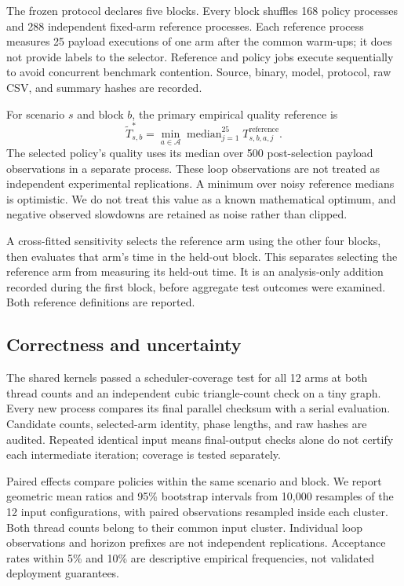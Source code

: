 \documentclass[conference]{IEEEtran}
\begin{document}
The frozen protocol declares five blocks. Every block shuffles 168 policy
processes and 288 independent fixed-arm reference processes. Each reference
process measures 25 payload executions of one arm after the common warm-ups;
it does not provide labels to the selector. Reference and policy jobs execute
sequentially to avoid concurrent benchmark contention. Source, binary, model,
protocol, raw CSV, and summary hashes are recorded.

For scenario $s$ and block $b$, the primary empirical quality reference is
\begin{equation}
 \widetilde T^*_{s,b}=\min_{a\in\mathcal A}
 \operatorname{median}_{j=1}^{25}T_{s,b,a,j}^{\mathrm{reference}}.
\end{equation}
The selected policy's quality uses its median over 500 post-selection payload
observations in a separate process. These loop observations are not treated
as independent experimental replications. A minimum over noisy reference medians is optimistic. We do
not treat this value as a known mathematical optimum, and negative observed
slowdowns are retained as noise rather than clipped.

A cross-fitted sensitivity selects the reference arm using the other four
blocks, then evaluates that arm's time in the held-out block. This separates
selecting the reference arm from measuring its held-out time. It is an
analysis-only addition recorded during the first block, before aggregate
test outcomes were examined. Both reference definitions are reported.

\subsection{Correctness and uncertainty}

The shared kernels passed a scheduler-coverage test for all 12 arms at both
thread counts and an independent cubic triangle-count check on a tiny graph.
Every new process compares its final parallel checksum with a serial
evaluation. Candidate counts, selected-arm identity, phase lengths, and raw
hashes are audited. Repeated identical input means final-output checks alone
do not certify each intermediate iteration; coverage is tested separately.

Paired effects compare policies within the same scenario and block.
We report geometric mean ratios and 95\% bootstrap intervals from 10,000
resamples of the 12 input configurations, with paired observations resampled
inside each cluster. Both thread counts belong to their common input cluster.
Individual loop observations and horizon prefixes are not independent
replications. Acceptance rates within 5\% and 10\% are descriptive empirical
frequencies, not validated deployment guarantees.
\end{document}

